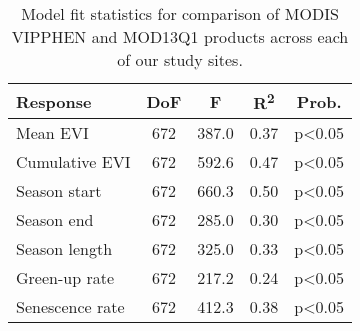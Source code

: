 \begin{table}[h]
\caption[Model fit statistics comparing MODIS VIPPHEN and MOD13Q1 phenological metrics]{Model fit statistics for comparison of MODIS VIPPHEN and MOD13Q1 products across each of our study sites.} 
\label{phen:annot_df}
\begin{tabular}{lSSSc}
  \toprule
{Response} & {DoF} & {F} & {R\textsuperscript{2}} & {Prob.} \\ 
  \midrule
Mean EVI & 672 & 387.0 & 0.37 & p<0.05 \\ 
  Cumulative EVI & 672 & 592.6 & 0.47 & p<0.05 \\ 
  Season start & 672 & 660.3 & 0.50 & p<0.05 \\ 
  Season end & 672 & 285.0 & 0.30 & p<0.05 \\ 
  Season length & 672 & 325.0 & 0.33 & p<0.05 \\ 
  Green-up rate & 672 & 217.2 & 0.24 & p<0.05 \\ 
  Senescence rate & 672 & 412.3 & 0.38 & p<0.05 \\ 
   \bottomrule
\end{tabular}
\end{table}

